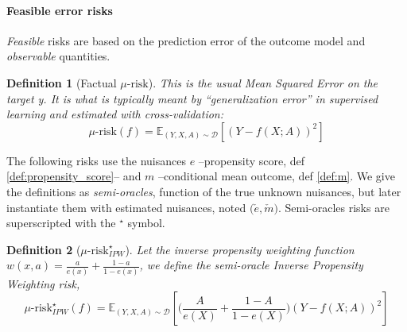 \documentclass[10pt]{article}
\newtheorem{definition}{Definition}
\begin{document}
\begin{multicols}{2}
    \paragraph{Feasible error risks}\label{paragraph:feasible_metrics}
    \emph{Feasible} risks are based on the prediction error of the outcome model
    and \emph{observable} quantities.

    \begin{definition}[Factual $\mu\text{-risk}$]\label{def:mu_risk}
        \cite{shalit_estimating_2017} This is the usual Mean Squared Error on
        the target y. It is what is typically meant by ``generalization error'' in
        supervised learning and estimated with cross-validation:
        \begin{equation*}\label{eq:mu_risk}
            \mu\text{-risk}(f)=\mathbb{E}_{(Y, X, A) \sim \mathcal D}\left[(Y-f(X ; A))^2 \right]
        \end{equation*}
    \end{definition}

    The following risks use the nuisances $e$
    --propensity score, def \ref{def:propensity_score}-- and $m$ --conditional mean
    outcome, def \ref{def:m}. We give the definitions as \textit{semi-oracles},
    function of the true unknown nuisances, but later instantiate them with estimated
    nuisances, noted $\big(\check e, \check m \big)$. Semi-oracles risks are
    superscripted with the $^{\star}$ symbol.


    \begin{definition}[$\mu\text{-risk}_{IPW}^{\star}$]\label{def:mu_ipw_risk}
        \cite{vanderlaan_unified_2003} Let the inverse propensity weighting
        function $w(x, a) = \frac{a}{e(x)} + \frac{1 - a}{1 - e(x)}$, we define the
        semi-oracle Inverse Propensity Weighting risk,
        \begin{equation*}\label{eq:mu_ipw_risk}
            \mu\text{-risk}_{IPW}^{\star}(f) = \mathbb{E}_{(Y, X, A) \sim \mathcal D}\left[ \Big( \frac{A}{e(X)} + \frac{1-A}{1-e(X)} \Big) (Y-f(X ; A))^2 \right]
        \end{equation*}
    \end{definition}

    \smallskip


\end{multicols}
\end{document}
